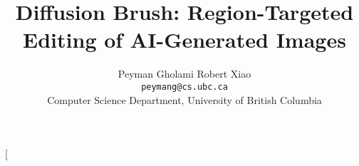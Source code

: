 \documentclass[10pt,twocolumn,letterpaper]{article}
\begin{document}
\title{ Diffusion Brush: Region-Targeted Editing of AI-Generated Images}

\author{Peyman Gholami \qquad Robert Xiao\\
{\tt\small peymang@cs.ubc.ca} \\
\small{Computer Science Department, University of British Columbia}
}



\twocolumn[{%
\renewcommand\twocolumn[1][]{#1}%

\maketitle
\setlength{\tabcolsep}{5pt}
\def\qualheight{2.7cm}
\begin{center}
\def\fsh{\small\textbf}
\vspace{-0.5 cm}
\begin{tabular}{ccccc}


\end{tabular}
\end{center}}
\end{document}
